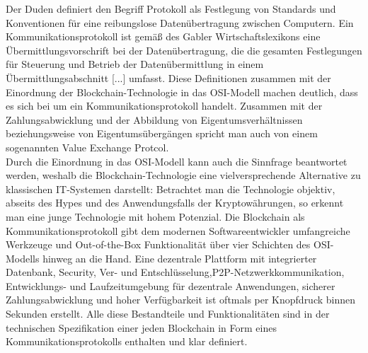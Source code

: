 Der Duden \cite{Duden2006} definiert den Begriff Protokoll als \glqq Festlegung von Standards und Konventionen für eine reibungslose Datenübertragung zwischen Computern\grqq. Ein Kommunikationsprotokoll ist gemäß des Gabler Wirtschaftslexikons \cite{Gabler2004} \glqq eine Übermittlungsvorschrift bei der Datenübertragung, die die gesamten Festlegungen für Steuerung und Betrieb der Datenübermittlung in einem Übermittlungsabschnitt [...] umfasst\grqq. Diese Definitionen zusammen mit der Einordnung der Blockchain-Technologie in das \ac{OSI}-Modell machen deutlich, dass es sich bei um ein Kommunikationsprotokoll handelt. Zusammen mit der Zahlungsabwicklung und der Abbildung von Eigentumsverhältnissen beziehungsweise von Eigentumsübergängen spricht man auch von einem sogenannten \glqq Value Exchange Protcol\grqq \cite{bheemaiah2015}.\\
Durch die Einordnung in das \ac{OSI}-Modell kann auch die Sinnfrage beantwortet werden, weshalb die Blockchain-Technologie eine vielversprechende Alternative zu klassischen IT-Systemen darstellt: Betrachtet man die Technologie objektiv, abseits des Hypes und des Anwendungsfalls der Kryptowährungen, so erkennt man eine junge Technologie mit hohem Potenzial. Die Blockchain als Kommunikationsprotokoll gibt dem modernen Softwareentwickler umfangreiche Werkzeuge und Out-of-the-Box Funktionalität über vier Schichten des \ac{OSI}-Modells hinweg an die Hand. Eine dezentrale Plattform mit integrierter Datenbank, Security, Ver- und Entschlüsselung,\ac{P2P}-Netzwerkkommunikation, Entwicklungs- und Laufzeitumgebung für dezentrale Anwendungen, sicherer Zahlungsabwicklung und hoher Verfügbarkeit ist oftmals per Knopfdruck binnen Sekunden erstellt. Alle diese Bestandteile und Funktionalitäten sind in der technischen Spezifikation einer jeden Blockchain in Form eines Kommunikationsprotokolls enthalten und klar definiert.


%
%

